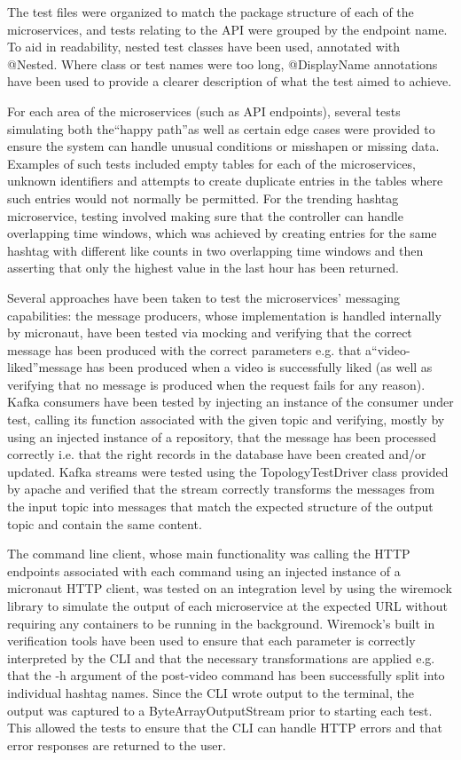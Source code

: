 \documentclass[parskip=full]{article}
\begin{document}
The test files were organized to match the package structure of each of the microservices, and tests relating to the API were grouped by the endpoint name.
To aid in readability, nested test classes have been used, annotated with @Nested.
Where class or test names were too long, @DisplayName annotations have been used to provide a clearer description of what the test aimed to achieve.

For each area of the microservices (such as API endpoints), several tests simulating both the``happy path''as well as certain edge cases were provided to ensure the system can handle unusual conditions or misshapen or missing data.
Examples of such tests included empty tables for each of the microservices, unknown identifiers and attempts to create duplicate entries in the tables where such entries would not normally be permitted.
For the trending hashtag microservice, testing involved making sure that the controller can handle overlapping time windows, which was achieved by creating entries for the same hashtag with different like counts in two overlapping time windows and then asserting that only the highest value in the last hour has been returned.

Several approaches have been taken to test the microservices' messaging capabilities: the message producers, whose implementation is handled internally by micronaut, have been tested via mocking and verifying that the correct message has been produced with the correct parameters e.g. that a``video-liked''message has been produced when a video is successfully liked (as well as verifying that no message is produced when the request fails for any reason).
Kafka consumers have been tested by injecting an instance of the consumer under test, calling its function associated with the given topic and verifying, mostly by using an injected instance of a repository, that the message has been processed correctly i.e. that the right records in the database have been created and/or updated.
Kafka streams were tested using the TopologyTestDriver class provided by apache and verified that the stream correctly transforms the messages from the input topic into messages that match the expected structure of the output topic and contain the same content.

The command line client, whose main functionality was calling the HTTP endpoints associated with each command using an injected instance of a micronaut HTTP client, was tested on an integration level by using the wiremock library to simulate the output of each microservice at the expected URL without requiring any containers to be running in the background.
Wiremock's built in verification tools have been used to ensure that each parameter is correctly interpreted by the CLI and that the necessary transformations are applied e.g. that the -h argument of the post-video command has been successfully split into individual hashtag names.
Since the CLI wrote output to the terminal, the output was captured to a ByteArrayOutputStream prior to starting each test.
This allowed the tests to ensure that the CLI can handle HTTP errors and that error responses are returned to the user.
\end{document}
